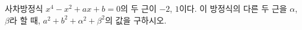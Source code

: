 사차방정식 $x^4-x^2+ax+b=0$의 두 근이 $-2$, $1$이다. 이 방정식의 다른 두 근을 $\alpha$, $\beta$라 할 때, $a^2+b^2+\alpha^2+\beta^2$의 값을 구하시오. 

